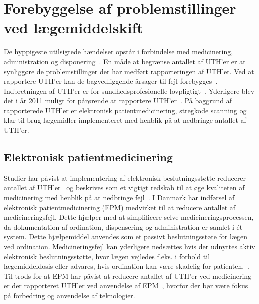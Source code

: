 \section{Forebyggelse af problemstillinger ved lægemiddelskift}
De hyppigeste utilsigtede hændelser opstår i forbindelse med medicinering, administration og disponering~\citep{Jensen2014}. 
En måde at begrænse antallet af UTH'er er at synliggøre de problemstillinger der har medført rapporteringen af UTH'et. Ved at rapportere UTH'er kan de bagvedliggende årsager til fejl forebygges~\citep{StyrelsenforPatientsikkerhed2017}. Indbretningen af UTH'er er for sundhedsprofesionelle lovpligtigt~\citep{Jensen2014}. Yderligere blev det i år 2011 muligt for pårørende at rapportere UTH'er~\citep{Jensen2014}. På baggrund af rapporterede UTH'er er elektronisk patientmedicinering, stregkode scanning og klar-til-brug lægemidler implementeret med henblik på at nedbringe antallet af UTH'er.

\subsection{Elektronisk patientmedicinering}
Studier har påvist at implementering af elektronisk beslutningsstøtte reducerer antallet af UTH'er~\citep{DW1998,Bates2013,Cheng2011,Raboel2005} og beskrives som et vigtigt redskab til at øge kvaliteten af medicinering med henblik på at nedbringe fejl~\citep{Raboel2005}. I Danmark har indførsel af elektronisk patientmedicinering (EPM) medvirket til at reducere antallet af medicineringsfejl. Dette hjælper med at simplificere selve medicineringsprocessen, da dokumentation af ordination, dispensering og administration er samlet i ét system. Dette hjælpemiddel anvendes som et passivt beslutningsstøte for lægen ved ordination. Medicineringsfejl kan yderligere nedsættes hvis der udnyttes aktiv elektronisk beslutningsstøtte, hvor lægen vejledes f.eks. i forhold til lægemiddeldosis eller advares, hvis ordination kan være skadelig for patienten.~\citep{Raboel2005}. Til trods for at EPM har påvist at reducere antallet af UTH'er ved medicinering er der rapporteret UTH'er ved anvendelse af EPM~\citep{Syddanmark2008}, hvorfor der bør være fokus på forbedring og anvendelse af teknologier. 


